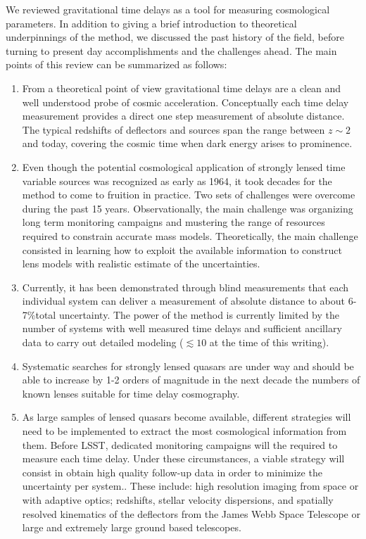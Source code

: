 We reviewed gravitational time delays as a tool for measuring
cosmological parameters. In addition to giving a brief introduction to
theoretical underpinnings of the method, we discussed the past history
of the field, before turning to present day accomplishments and the
challenges ahead. The main points of this review can be summarized as
follows:

\begin{enumerate}
\item From a theoretical point of view gravitational time delays are a clean and well understood probe of cosmic acceleration. Conceptually each time delay measurement provides a direct one step measurement of absolute distance. The typical redshifts of deflectors and sources span the range between $z\sim2$ and today, covering the cosmic time when dark energy arises to prominence.
\item Even though the potential cosmological application of strongly lensed time variable sources was recognized as early as 1964, it took decades for the method to come to fruition in practice. Two sets of challenges were overcome during the past 15 years. Observationally, the main challenge was organizing long term monitoring campaigns and mustering the range of resources required to constrain accurate mass models. Theoretically, the main challenge consisted in learning how to exploit the available information to construct lens models with realistic estimate of the uncertainties.
\item Currently, it has been demonstrated through blind measurements that each individual system can deliver a measurement of absolute distance to about 6-7\%total uncertainty.  The power of the method is currently limited by the number of systems with well measured time delays and sufficient ancillary data to carry out detailed modeling ($\lesssim10$ at the time of this writing).
\item Systematic searches for strongly lensed quasars are under way and should be able to increase by 1-2 orders of magnitude in the next decade the numbers of known lenses suitable for time delay cosmography.
\item As large samples of lensed quasars become available, different strategies will need to be implemented to extract the most cosmological information from them. Before LSST, dedicated monitoring campaigns will the required to measure each time delay. Under these circumstances, a viable strategy will consist in obtain high quality follow-up data in order to minimize the uncertainty per system.. These include: high resolution imaging from space or with adaptive optics; redshifts, stellar velocity dispersions, and spatially resolved kinematics of the deflectors from the James Webb Space Telescope or large and extremely large ground based telescopes.

\end{enumerate}
